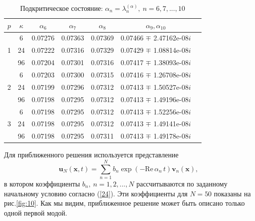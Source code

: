 \documentclass[authoryear]{elsarticle}
\begin{document}
\begin{table}[h]
\caption{Подкритическое состояние:  $\alpha_n = \lambda_n^{(\alpha )}, \ n = 6,7, ..., 10$}
\label{t-7}
\begin{center}
\begin{tabular}{ccccccc}
\hline
$p$ & $\kappa$ & $\alpha_6$ &  $\alpha_7$ & $\alpha_8$ &  $\alpha_9, \alpha_{10}$ \\ 
\hline
   & 6 & 0.07276 & 0.07363 & 0.07369 & 0.07466 $\mp$ 2.47162e-08$i$ \\ 
1 & 24 & 0.07222 & 0.07316 & 0.07329 & 0.07429 $\mp$ 1.08814e-08$i$ \\ 
  & 96 & 0.07204 & 0.07301 & 0.07316 & 0.07417 $\mp$ 1.38093e-08$i$ \\
\hline
   & 6 & 0.07203 & 0.07300 & 0.07315 & 0.07416 $\mp$ 1.26708e-08$i$ \\ 
2 & 24 & 0.07199 & 0.07296 & 0.07312 & 0.07413 $\mp$ 1.50527e-08$i$ \\ 
  & 96 & 0.07198 & 0.07295 & 0.07312 & 0.07413 $\mp$ 1.49196e-08$i$ \\ 
\hline
   & 6 & 0.07198 & 0.07295 & 0.07312 & 0.07413 $\mp$ 1.52256e-08$i$ \\ 
3 & 24 & 0.07198 & 0.07295 & 0.07312 & 0.07413 $\mp$ 1.49141e-08$i$ \\ 
  & 96 & 0.07198 & 0.07295 & 0.07311 & 0.07413 $\mp$ 1.49178e-08$i$ \\ 
\hline
\end{tabular}
\end{center}
\end{table}

Для приближенного решения используется представление
\begin{equation}\label{26}
 \bm u_N(\bm x, t) = 
 \sum_{n=1}^{N} b_n \exp(- \mathrm{Re} \, \alpha_n \, t) \bm v_n(\bm x) ,  
\end{equation} 
в котором коэффициенты $b_n, \ n = 1,2, ..., N$ рассчитываются по заданному начальному
условию согласно (\ref{24}). Эти коэффициенты для $N=50$ показаны на рис.\ref{fig:10}. 
Как мы видим, приближенное решение может быть описано только одной первой модой.
\end{document}

